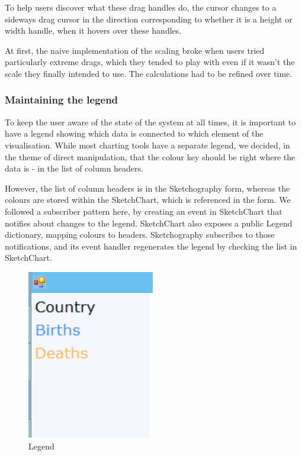 	To help users discover what these drag handles do, the cursor changes to a sideways drag cursor in the direction corresponding to whether it is a height or width handle, when it hovers over these handles.	
	
	At first, the naive implementation of the scaling broke when users tried particularly extreme drags, which they tended to play with even if it wasn't the scale they finally intended to use. The calculations had to be refined over time.
	
	\subsubsection{Maintaining the legend}
	To keep the user aware of the state of the system at all times, it is important to have a legend showing which data is connected to which element of the visualisation. While most charting tools have a separate legend, we decided, in the theme of direct manipulation, that the colour key should be right where the data is - in the list of column headers. 
	
	However, the list of column headers is in the Sketchography form, whereas the colours are stored within the SketchChart, which is referenced in the form. We followed a subscriber pattern here, by creating an event in SketchChart that notifies about changes to the legend. SketchChart also exposes a public Legend dictionary, mapping colours to headers. Sketchography subscribes to those notifications, and its event handler regenerates the legend by checking the list in SketchChart.	
	
	\begin{figure}
	\includegraphics[scale=1]{legend}
	\caption{Legend}
	\end{figure}
	
	
